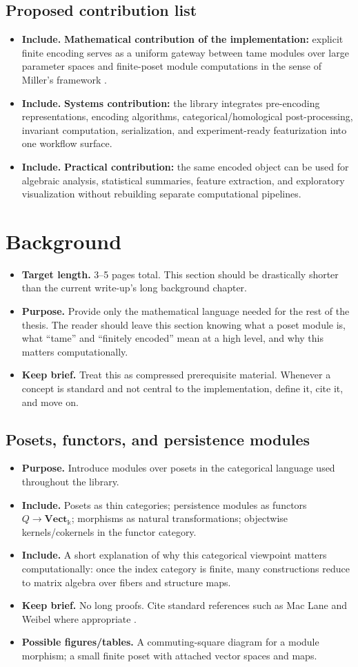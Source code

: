 \documentclass[11pt]{article}
\newcommand{\kk}{\Bbbk}
\newenvironment{plan}{\begin{itemize}[leftmargin=1.6em,itemsep=0.35em,topsep=0.25em]}{\end{itemize}}
\newcommand{\target}[1]{\item \textbf{Target length.} #1}
\newcommand{\purpose}[1]{\item \textbf{Purpose.} #1}
\newcommand{\includeitems}[1]{\item \textbf{Include.} #1}
\newcommand{\keepbrief}[1]{\item \textbf{Keep brief.} #1}
\newcommand{\figures}[1]{\item \textbf{Possible figures/tables.} #1}
\begin{document}
\subsection{Proposed contribution list}

\begin{plan}
    \includeitems{\textbf{Mathematical contribution of the implementation:} explicit finite encoding serves as a uniform gateway between tame modules over large parameter spaces and finite-poset module computations in the sense of Miller's framework \cite{Mil20}.}
    \includeitems{\textbf{Systems contribution:} the library integrates pre-encoding representations, encoding algorithms, categorical/homological post-processing, invariant computation, serialization, and experiment-ready featurization into one workflow surface.}
    \includeitems{\textbf{Practical contribution:} the same encoded object can be used for algebraic analysis, statistical summaries, feature extraction, and exploratory visualization without rebuilding separate computational pipelines.}
\end{plan}

\section{Background}\label{sec:background}

\begin{plan}
    \target{3--5 pages total. This section should be drastically shorter than the current write-up's long background chapter.}
    \purpose{Provide only the mathematical language needed for the rest of the thesis. The reader should leave this section knowing what a poset module is, what ``tame'' and ``finitely encoded'' mean at a high level, and why this matters computationally.}
    \keepbrief{Treat this as compressed prerequisite material. Whenever a concept is standard and not central to the implementation, define it, cite it, and move on.}
\end{plan}

\subsection{Posets, functors, and persistence modules}

\begin{plan}
    \purpose{Introduce modules over posets in the categorical language used throughout the library.}
    \includeitems{Posets as thin categories; persistence modules as functors $Q \to \mathbf{Vect}_{\kk}$; morphisms as natural transformations; objectwise kernels/cokernels in the functor category.}
    \includeitems{A short explanation of why this categorical viewpoint matters computationally: once the index category is finite, many constructions reduce to matrix algebra over fibers and structure maps.}
    \keepbrief{No long proofs. Cite standard references such as Mac Lane and Weibel where appropriate \cite{Mac98,Wei94}.}
    \figures{A commuting-square diagram for a module morphism; a small finite poset with attached vector spaces and maps.}
\end{plan}
\end{document}
